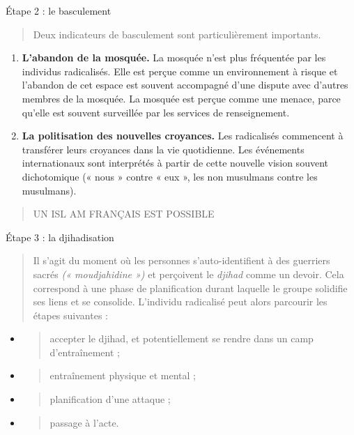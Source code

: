 Étape 2 : le basculement

\begin{quote}
Deux indicateurs de basculement sont particulièrement importants.
\end{quote}

\begin{enumerate}
\def\labelenumi{\arabic{enumi}.}
\item
  \textbf{L'abandon de la mosquée.} La mosquée n'est plus fréquentée par
  les individus radicalisés. Elle est perçue comme un environnement à
  risque et l'abandon de cet espace est souvent accompagné d'une dispute
  avec d'autres membres de la mosquée. La mosquée est perçue comme une
  menace, parce qu'elle est souvent surveillée par les services de
  renseignement.
\item
  \textbf{La politisation des nouvelles croyances.} Les radicalisés
  commencent à transférer leurs croyances dans la vie quotidienne. Les
  événements internationaux sont interprétés à partir de cette nouvelle
  vision souvent dichotomique (« nous » contre « eux », les non
  musulmans contre les musulmans).
\end{enumerate}

\begin{quote}
UN ISL AM FRANÇAIS EST POSSIBLE
\end{quote}

Étape 3 : la djihadisation

\begin{quote}
Il s'agit du moment où les personnes s'auto-identifient à des guerriers
sacrés \emph{(« moudjahidine »)} et perçoivent le \emph{djihad} comme un
devoir. Cela correspond à une phase de planification durant laquelle le
groupe solidifie ses liens et se consolide. L'individu radicalisé peut
alors parcourir les étapes suivantes :
\end{quote}

\begin{itemize}
\item
  \begin{quote}
  accepter le djihad, et potentiellement se rendre dans un camp
  d'entraînement ;
  \end{quote}
\item
  \begin{quote}
  entraînement physique et mental ;
  \end{quote}
\item
  \begin{quote}
  planification d'une attaque ;
  \end{quote}
\item
  \begin{quote}
  passage à l'acte.
  \end{quote}
\end{itemize}

